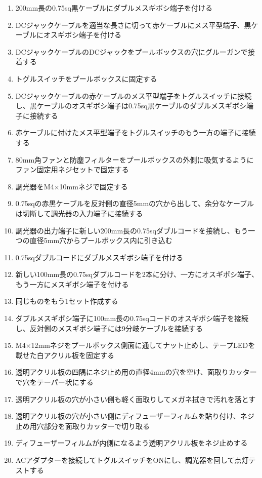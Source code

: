 \documentclass[titlepage,10pt,a4paper,uplatex]{jsbook}
\begin{document}
\begin{enumerate}
\item 200mm長の0.75sq黒ケーブルにダブルメスギボシ端子を付ける
\item DCジャックケーブルを適当な長さに切って赤ケーブルにメス平型端子、黒ケーブルにオスギボシ端子を付ける
\item DCジャックケーブルのDCジャックをプールボックスの穴にグルーガンで接着する
\item トグルスイッチをプールボックスに固定する
\item DCジャックケーブルの赤ケーブルのメス平型端子をトグルスイッチに接続し、黒ケーブルのオスギボシ端子は0.75sq黒ケーブルのダブルメスギボシ端子に接続する
\item 赤ケーブルに付けたメス平型端子をトグルスイッチのもう一方の端子に接続する
\item 80mm角ファンと防塵フィルターをプールボックスの外側に吸気するようにファン固定用ネジセットで固定する
\item 調光器をM4×10mmネジで固定する
\item 0.75sqの赤黒ケーブルを反対側の直径5mmの穴から出して、余分なケーブルは切断して調光器の入力端子に接続する
\item 調光器の出力端子に新しい200mm長の0.75sqダブルコードを接続し、もう一つの直径5mm穴からプールボックス内に引き込む
\item 0.75sqダブルコードにダブルメスギボシ端子を付ける
\item 新しい100mm長の0.75sqダブルコードを2本に分け、一方にオスギボシ端子、もう一方にメスギボシ端子を付ける
\item 同じものをもう1セット作成する
\item ダブルメスギボシ端子に100mm長の0.75sqコードのオスギボシ端子を接続し、反対側のメスギボシ端子には9分岐ケーブルを接続する
\item M4×12mmネジをプールボックス側面に通してナット止めし、テープLEDを載せた白アクリル板を固定する
\item 透明アクリル板の四隅にネジ止め用の直径4mmの穴を空け、面取りカッターで穴をテーパー状にする
\item 透明アクリル板の穴が小さい側も軽く面取りしてメガネ拭きで汚れを落とす
\item 透明アクリル板の穴が小さい側にディフューザーフィルムを貼り付け、ネジ止め用穴部分を面取りカッターで切り取る
\item ディフューザーフィルムが内側になるよう透明アクリル板をネジ止めする
\item ACアダプターを接続してトグルスイッチをONにし、調光器を回して点灯テストする
\end{enumerate}
\end{document}
